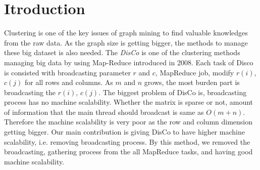 \documentclass[10pt]{article}
\begin{document}
	\section{Itroduction~}
	Clustering is one of the key issues of graph mining to find valuable knowledges from the raw data. As the graph size is getting bigger, the methods to manage these big dataset is also needed. The \emph{DisCo} is one of the clustering methods managing big data by using Map-Reduce introduced in 2008. Each task of Disco is consisted with  broadcasting parameter $r$ and $c$, MapReduce job, modify $r(i)$, $c(j)$ for all rows and columns. As $m$ and $n$ grows, the most burden part is broadcasting the $r(i)$, $c(j)$. The biggest problem of DisCo is, broadcasting process has no machine scalability. Whether the matrix is sparse or not, amount of information that the main thread should broadcast is same as $O(m+n)$. Therefore the machine scalability is very poor as the row and column dimension getting bigger. \newline Our main contribution is giving DisCo to have higher machine scalability, i.e. removing broadcasting process. By this method, we removed the broadcasting, gathering process from the all MapReduce tasks, and having good machine scalability.
	
\end{document}

